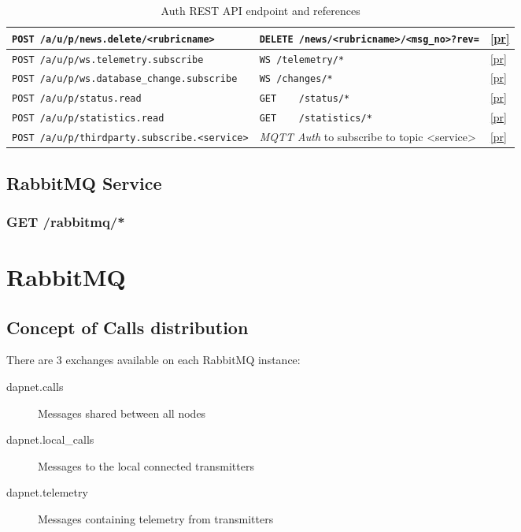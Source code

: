 \begin{table}[htbp]
\begin{tabular}{|l|l|l|}
    \verb|POST /a/u/p/news.delete/<rubricname>| & \verb|DELETE /news/<rubricname>/<msg_no>?rev=| & \ref{pr} \\ \hline
    \hline
    \verb|POST /a/u/p/ws.telemetry.subscribe|       & \verb|WS /telemetry/*| & \ref{pr} \\
    \verb|POST /a/u/p/ws.database_change.subscribe| & \verb|WS /changes/*|   & \ref{pr} \\ \hline
    \hline
    \verb|POST /a/u/p/status.read|     & \verb|GET    /status/*|     & \ref{pr} \\ \hline
    \verb|POST /a/u/p/statistics.read| & \verb|GET    /statistics/*| & \ref{pr} \\ \hline
    \hline
    \verb|POST /a/u/p/thirdparty.subscribe.<service>| & \textit{MQTT Auth} to subscribe to topic <service> & \ref{pr} \\
    \hline
  \end{tabular}
  \caption{Auth REST API endpoint and references}
\end{table}

\newpage

\subsection{RabbitMQ Service}
\label{protocoldef:RabbitMQ}

\subsubsection{GET /rabbitmq/*}


\section{RabbitMQ}
\label{protocoldef:RabbitMQ}

\subsection{Concept of Calls distribution}
\label{protocoldef:RabbitMQ:calldistribution}

There are 3 exchanges available on each RabbitMQ instance:
\begin{description}
\item[dapnet.calls] Messages shared between all nodes
\item[dapnet.local\_calls] Messages to the local connected transmitters
\item[dapnet.telemetry] Messages containing telemetry from transmitters
\end{description}

